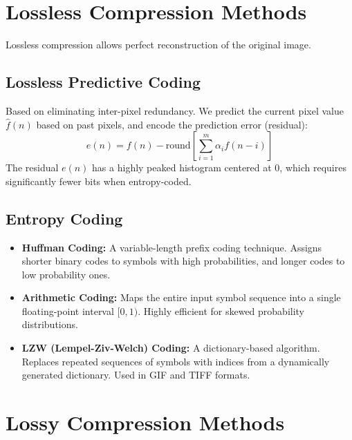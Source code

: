 \documentclass[12pt,a4paper]{article}
\begin{document}
\section{Lossless Compression Methods}

Lossless compression allows perfect reconstruction of the original image.

\subsection{Lossless Predictive Coding}
Based on eliminating inter-pixel redundancy. We predict the current pixel value $\hat{f}(n)$ based on past pixels, and encode the prediction error (residual):
\begin{equation}
  e(n) = f(n) - \text{round}\left[ \sum_{i=1}^m \alpha_i f(n-i) \right]
\end{equation}
The residual $e(n)$ has a highly peaked histogram centered at 0, which requires significantly fewer bits when entropy-coded.

\subsection{Entropy Coding}
\begin{itemize}[leftmargin=*, itemsep=3.5pt]
  \item \textbf{Huffman Coding:} A variable-length prefix coding technique. Assigns shorter binary codes to symbols with high probabilities, and longer codes to low probability ones.
  \item \textbf{Arithmetic Coding:} Maps the entire input symbol sequence into a single floating-point interval $[0,1)$. Highly efficient for skewed probability distributions.
  \item \textbf{LZW (Lempel-Ziv-Welch) Coding:} A dictionary-based algorithm. Replaces repeated sequences of symbols with indices from a dynamically generated dictionary. Used in GIF and TIFF formats.
\end{itemize}

\section{Lossy Compression Methods}
\end{document}
